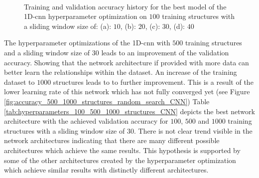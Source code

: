 \documentclass[conference]{IEEEtran}
\begin{document}
\begin{figure}[htp]
	\centering
	\quad
	\\
	\quad
	\caption{Training and validation accuracy history for the best model of the 1D-\gls{cnn} hyperparameter optimization on $ 100 $ training structures with a sliding window size of: (a): $ 10 $, (b): $ 20 $, (c): $ 30 $, (d): $ 40 $}
	\label{fig:accuracy_100_structures_random_search_cnn}
\end{figure}

The hyperparameter optimizations of the 1D-\gls{cnn} with $ 500 $ training structures and a sliding window size of $ 30 $ leads to an improvement of the validation accuracy. Showing that the network architecture if provided with more data can better learn the relationships within the dataset. An increase of the training dataset to $ 1000 $ structures leads to to further improvement. This is a result of the lower learning rate of this network which has not fully converged yet (see Figure \ref{fig:accuracy_500_1000_structures_random_search_CNN})  Table \ref{tab:hyperparameters_100_500_1000_structures_CNN} depicts the best network architecture with the achieved validation accuracy for $ 100 $, $ 500 $ and $ 1000 $ training structures with a sliding window size of $ 30 $. There is not clear trend visible in the network architectures indicating that there are many different possible architectures which achieve the same results. This hypothesis is supported by some of the other architectures created by the hyperparameter optimization which achieve similar results with distinctly different architectures.
\end{document}

